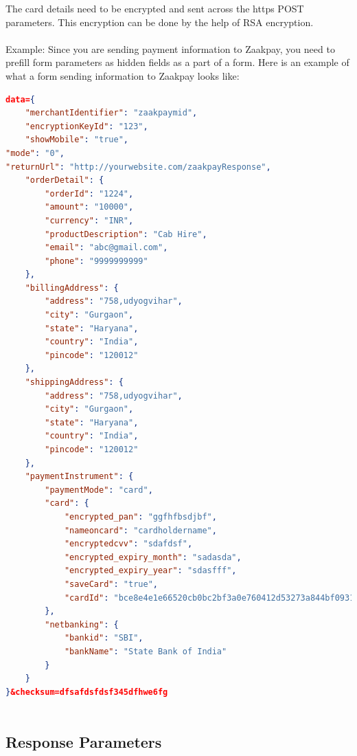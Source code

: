 \documentclass{article}
\begin{document}
The card details need to be encrypted and sent across the https POST parameters. This encryption can be done by the help of RSA encryption.
\\
\\
\newpage
Example:
Since you are sending payment information to Zaakpay, you need to prefill form parameters as hidden
fields as a part of a form. Here is an example of what a form sending information to Zaakpay looks
like:
\begin{lstlisting}[language=json,breaklines=true]
data={ 
    "merchantIdentifier": "zaakpaymid", 
    "encryptionKeyId": "123", 
    "showMobile": "true", 
"mode": "0", 
"returnUrl": "http://yourwebsite.com/zaakpayResponse", 
    "orderDetail": { 
        "orderId": "1224", 
        "amount": "10000", 
        "currency": "INR", 
        "productDescription": "Cab Hire", 
        "email": "abc@gmail.com", 
        "phone": "9999999999" 
    }, 
    "billingAddress": { 
        "address": "758,udyogvihar", 
        "city": "Gurgaon", 
        "state": "Haryana", 
        "country": "India", 
        "pincode": "120012" 
    }, 
    "shippingAddress": { 
        "address": "758,udyogvihar", 
        "city": "Gurgaon", 
        "state": "Haryana", 
        "country": "India", 
        "pincode": "120012" 
    }, 
    "paymentInstrument": { 
        "paymentMode": "card", 
        "card": { 
            "encrypted_pan": "ggfhfbsdjbf", 
            "nameoncard": "cardholdername", 
            "encryptedcvv": "sdafdsf", 
            "encrypted_expiry_month": "sadasda", 
            "encrypted_expiry_year": "sdasfff", 
            "saveCard": "true", 
            "cardId": "bce8e4e1e66520cb0bc2bf3a0e760412d53273a844bf0931f2b3136a2ee0ada3~1" 
        }, 
        "netbanking": { 
            "bankid": "SBI", 
            "bankName": "State Bank of India" 
        } 
    } 
}&checksum=dfsafdsfdsf345dfhwe6fg 
 
\end{lstlisting}
 


\subsection{Response Parameters}
\end{document}
